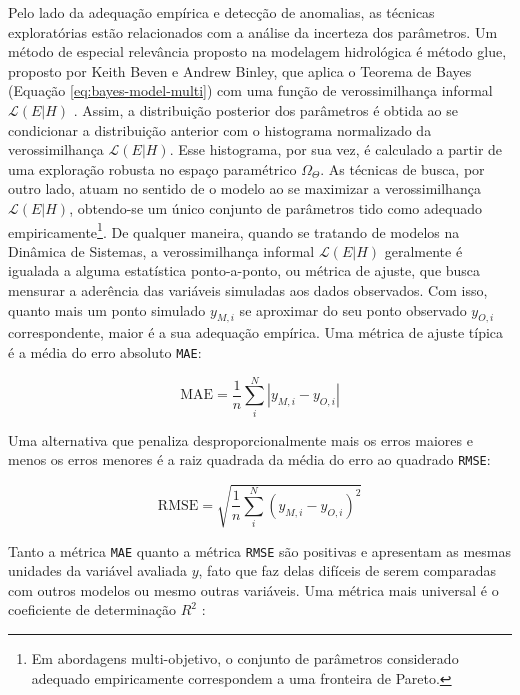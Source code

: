 \documentclass[./main.tex]{subfiles}
\begin{document}
\par Pelo lado da adequação empírica e detecção de anomalias, as técnicas exploratórias estão relacionados com a análise da incerteza dos parâmetros. Um método de especial relevância proposto na modelagem hidrológica é método \acrfull{glue}, proposto por Keith Beven e Andrew Binley, que aplica o Teorema de Bayes (Equação \eqref{eq:bayes-model-multi}) com uma função de verossimilhança informal $\mathcal{L}(E|H)$ \cite{beven1992}. Assim, a distribuição posterior dos parâmetros é obtida ao se condicionar a distribuição anterior com o histograma normalizado da verossimilhança $\mathcal{L}(E|H)$. Esse histograma, por sua vez, é calculado a partir de uma exploração robusta no espaço paramétrico $\Omega_{\Theta}$. As técnicas de busca, por outro lado, atuam no sentido de  o modelo ao se maximizar a verossimilhança $\mathcal{L}(E|H)$, obtendo-se um único conjunto de parâmetros tido como adequado empiricamente\footnote{Em abordagens multi-objetivo, o conjunto de parâmetros considerado adequado empiricamente correspondem a uma fronteira de Pareto.}. De qualquer maneira, quando se tratando de modelos na Dinâmica de Sistemas, a verossimilhança informal $\mathcal{L}(E|H)$ geralmente é igualada a alguma estatística ponto-a-ponto, ou métrica de ajuste, que busca mensurar a aderência das variáveis simuladas aos dados observados. Com isso, quanto mais um ponto simulado $y_{M, i}$ se aproximar do seu ponto observado $y_{O, i}$ correspondente, maior é a sua adequação empírica. Uma métrica de ajuste típica é a média do erro absoluto \texttt{MAE}:
\begin{linenomath*}
\begin{equation} 
	\label{eq:mae}
 \text{MAE} = \frac{1}{n}\sum_{i}^{N} |y_{M, i} - y_{O, i}| 
\end{equation}
\end{linenomath*}
Uma alternativa que penaliza desproporcionalmente mais os erros maiores e menos os erros menores é a raiz quadrada da média do erro ao quadrado \texttt{RMSE}:
\begin{linenomath*}
\begin{equation} 
	\label{eq:rmse}
 \text{RMSE} = \sqrt{\frac{1}{n}\sum_{i}^{N} (y_{M, i} - y_{O, i})^2}  
\end{equation}
\end{linenomath*}
Tanto a métrica \texttt{MAE} quanto a métrica \texttt{RMSE} são positivas e apresentam as mesmas unidades da variável avaliada $y$, fato que faz delas difíceis de serem comparadas com outros modelos ou mesmo outras variáveis. Uma métrica mais universal é o coeficiente de determinação $R^2$ \cite{glantz2001}: 
\end{document}
